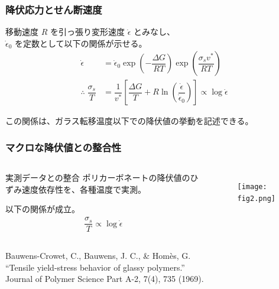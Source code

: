 \documentclass[1４pt, dvipdfmx]{beamer}
\begin{document}
\begin{frame}
\frametitle{降伏応力とせん断速度}

\large
移動速度 $R$ を引っ張り変形速度 $\dot{\epsilon}$ とみなし、\\ $\dot{\epsilon}_0$ を定数として以下の関係が示せる。
\normalsize
	\begin{align*}
	\dot{\epsilon} 
	&= \dot{\epsilon}_0 \exp \left( - \dfrac{\Delta G}{RT} \right) 
		\exp \left( \dfrac{ \sigma_s v^*}{RT} \right) \\
	\therefore \; \dfrac{\sigma_s}{T} 
	&= \dfrac{1}{v^*} 
		\left[
			\dfrac{\Delta G}{T} 
			+ R \ln 
			\left(
			\dfrac{\dot{\epsilon}}{\dot{\epsilon}_0} 
			\right) 
		\right] 
	\propto \log \dot{\epsilon}
	\end{align*}

\large

この関係は、ガラス転移温度以下での降伏値の挙動を記述できる。
\end{frame}

\begin{frame}
\frametitle{マクロな降伏値との整合性}


\begin{columns}[totalwidth=1\textwidth]

\begin{block}{実測データとの整合}
ポリカーボネートの降伏値のひずみ速度依存性を、各種温度で実測。

以下の関係が成立。
\begin{align*}
\dfrac{\sigma_s}{T} 
	\propto \log \dot{\epsilon}
\end{align*}
\end{block}

	\begin{figure}
	\centering
	\texttt{[image: fig2.png]}
	\end{figure}
%

\end{columns}
Bauwens-Crowet, C., Bauwens, J. C., \& Homès, G. \\
``Tensile yield-stress behavior of glassy polymers.''\\
Journal of Polymer Science Part A-2, 7(4), 735 (1969). 
\end{frame}
\end{document}
